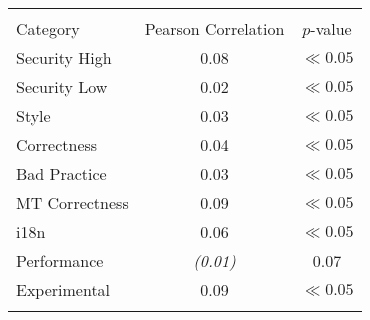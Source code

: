 
\begin{tabular}{lcc}
\hline \\
Category & Pearson Correlation & $p$-value \\ \hline 
Security High & 0.08 & $\ll 0.05$\\
Security Low & 0.02 & $\ll 0.05$\\
Style & 0.03 & $\ll 0.05$\\
Correctness & 0.04 & $\ll 0.05$\\
Bad Practice & 0.03 & $\ll 0.05$\\
MT Correctness & 0.09 & $\ll 0.05$\\
i18n & 0.06 & $\ll 0.05$\\
Performance & {\it (0.01) } & 0.07\\
Experimental & 0.09 & $\ll 0.05$\\
\hline \\
\end{tabular}
